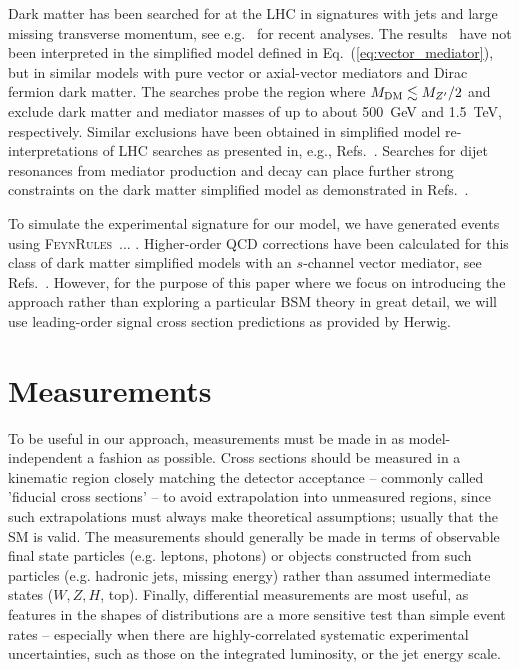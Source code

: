 \documentclass[floatfix]{article}
\begin{document}
Dark matter has been searched for at the LHC in signatures with jets and large missing transverse momentum, see e.g.~\cite{Aaboud:2016tnv,CMS:2016tns} 
for recent analyses. 
The results~\cite{Aaboud:2016tnv,CMS:2016tns}  have not been interpreted in the simplified model defined in Eq.~(\ref{eq:vector_mediator}), but in 
similar models with pure vector or axial-vector mediators and Dirac fermion dark matter. The  searches probe the region where $M_{\rm DM} \lesssim M_{Z^{\prime}}/2$ 
and exclude dark matter and mediator masses of up to about 500~GeV and 1.5~TeV, respectively. Similar exclusions have been obtained in simplified 
model re-interpretations of LHC searches as presented in, e.g.,  Refs.~\cite{Kahlhoefer:2015bea, Heisig:2015ira}. Searches for dijet resonances from 
mediator production and decay can place further strong constraints on the dark matter simplified model as demonstrated in Refs.~\cite{Chala:2015ama,Fairbairn:2016iuf}. 

To simulate the experimental signature for our model, we have generated events using \textsc{FeynRules}~\cite{Alloul:2013bka}... 
. Higher-order QCD corrections have been calculated for this class of dark matter simplified models 
with an $s$-channel vector mediator, see Refs.~\cite{Fox:2012ru,Haisch:2013ata,Backovic:2015soa,Neubert:2015fka}. However, for the purpose of this paper where we focus on introducing the \Contur approach rather than exploring 
a particular BSM theory in great detail, we will use leading-order signal cross section predictions as provided by Herwig.  

\section{Measurements}\label{sec:measurements}

To be useful in our approach, measurements must be made in as model-independent a fashion as possible. 
Cross sections should be measured in a kinematic region closely matching the detector acceptance -- commonly called 
'fiducial cross sections' -- to avoid extrapolation into unmeasured regions, since such extrapolations must always make 
theoretical assumptions; usually that the SM is valid. The measurements should generally be made in terms of observable final
state particles (e.g. leptons, photons) or objects constructed from such particles (e.g. hadronic jets, missing energy) 
rather than assumed intermediate states ($W, Z, H$, top). Finally, differential measurements are most useful, as features
in the shapes of distributions are a more sensitive test than simple event rates -- especially when there are
highly-correlated systematic experimental uncertainties, such as those on the integrated luminosity, or the jet energy scale.
\end{document}
